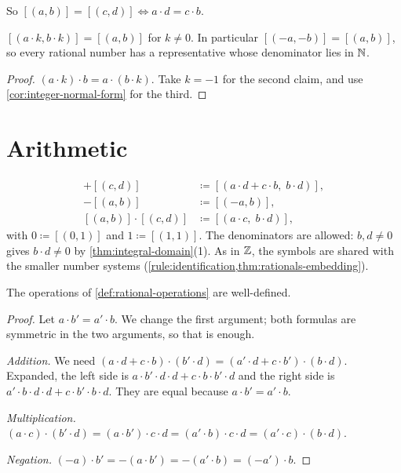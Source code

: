 So $[(a, b)] = [(c, d)] \Leftrightarrow a \cdot d = c \cdot b$.

\begin{lemma}[Expanding]
\label{lem:expand}
$[(a \cdot k, b \cdot k)] = [(a, b)]$ for $k \neq 0$. In particular $[(-a, -b)] =
[(a, b)]$, so every rational number has a representative whose denominator lies in
$\mathbb{N}$.
\end{lemma}

\begin{proof}
$(a \cdot k) \cdot b = a \cdot (b \cdot k)$. Take $k = -1$ for the second claim,
and use \cref{cor:integer-normal-form} for the third.
\end{proof}

\section{Arithmetic}

\begin{definition}[Operations on $\Q$]
\label{def:rational-operations}
\begin{align*}
  [(a, b)] + [(c, d)] &\coloneqq [(a \cdot d + c \cdot b,\; b \cdot d)], \\
  -[(a, b)] &\coloneqq [(-a, b)], \\
  [(a, b)] \cdot [(c, d)] &\coloneqq [(a \cdot c,\; b \cdot d)],
\end{align*}
with $0 \coloneqq [(0, 1)]$ and $1 \coloneqq [(1, 1)]$. The denominators are
allowed: $b, d \neq 0$ gives $b \cdot d \neq 0$ by \cref{thm:integral-domain}(1).
As in $\mathbb{Z}$, the symbols are shared with the smaller number systems
(\cref{rule:identification,thm:rationals-embedding}).
\end{definition}

\begin{lemma}
\label{lem:rational-well-defined}
The operations of \cref{def:rational-operations} are well-defined.
\end{lemma}

\begin{proof}
Let $a \cdot b' = a' \cdot b$. We change the first argument; both formulas are
symmetric in the two arguments, so that is enough.

\emph{Addition.} We need $(a \cdot d + c \cdot b) \cdot (b' \cdot d) = (a' \cdot d
+ c \cdot b') \cdot (b \cdot d)$. Expanded, the left side is $a \cdot b' \cdot d
\cdot d + c \cdot b \cdot b' \cdot d$ and the right side is $a' \cdot b \cdot d
\cdot d + c \cdot b' \cdot b \cdot d$. They are equal because $a \cdot b' = a'
\cdot b$.

\emph{Multiplication.} $(a \cdot c) \cdot (b' \cdot d) = (a \cdot b') \cdot c
\cdot d = (a' \cdot b) \cdot c \cdot d = (a' \cdot c) \cdot (b \cdot d)$.

\emph{Negation.} $(-a) \cdot b' = -(a \cdot b') = -(a' \cdot b) = (-a') \cdot b$.
\end{proof}

